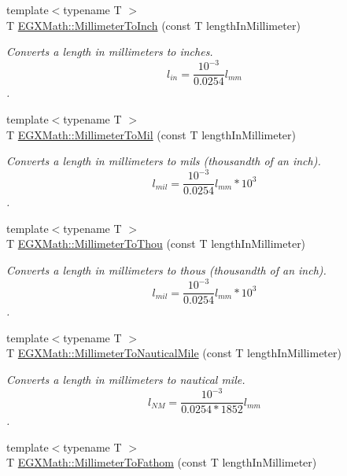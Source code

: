 \begin{DoxyCompactItemize}
{\footnotesize template$<$typename T $>$ }\\T \mbox{\hyperlink{group___e_g_x_math-_conversions-_length_conversions-_s_i-_millimeter-_imperial_gaaf0d8029c38ed975edf3805a0a3a53f7}{E\+G\+X\+Math\+::\+Millimeter\+To\+Inch}} (const T length\+In\+Millimeter)
\begin{DoxyCompactList}\small\item\em Converts a length in millimeters to inches. \[ l_{in}= \frac{10^{-3}}{0.0254} l_{mm} \]. \end{DoxyCompactList}\item 
{\footnotesize template$<$typename T $>$ }\\T \mbox{\hyperlink{group___e_g_x_math-_conversions-_length_conversions-_s_i-_millimeter-_imperial_gaf811317f4ce575df4ff0329491e92fac}{E\+G\+X\+Math\+::\+Millimeter\+To\+Mil}} (const T length\+In\+Millimeter)
\begin{DoxyCompactList}\small\item\em Converts a length in millimeters to mils (thousandth of an inch). \[ l_{mil}= \frac{10^{-3}}{0.0254} l_{mm} * 10^{3} \]. \end{DoxyCompactList}\item 
{\footnotesize template$<$typename T $>$ }\\T \mbox{\hyperlink{group___e_g_x_math-_conversions-_length_conversions-_s_i-_millimeter-_imperial_ga099bde3b0f85fbbfbe91f0162a392835}{E\+G\+X\+Math\+::\+Millimeter\+To\+Thou}} (const T length\+In\+Millimeter)
\begin{DoxyCompactList}\small\item\em Converts a length in millimeters to thous (thousandth of an inch). \[ l_{mil}= \frac{10^{-3}}{0.0254} l_{mm} * 10^{3} \]. \end{DoxyCompactList}\item 
{\footnotesize template$<$typename T $>$ }\\T \mbox{\hyperlink{group___e_g_x_math-_conversions-_length_conversions-_s_i-_millimeter-_nautical_ga05ed5fb1300287763d8927ee90315808}{E\+G\+X\+Math\+::\+Millimeter\+To\+Nautical\+Mile}} (const T length\+In\+Millimeter)
\begin{DoxyCompactList}\small\item\em Converts a length in millimeters to nautical mile. \[ l_{NM}= \frac{10^{-3}}{0.0254 * 1852} l_{mm} \]. \end{DoxyCompactList}\item 
{\footnotesize template$<$typename T $>$ }\\T \mbox{\hyperlink{group___e_g_x_math-_conversions-_length_conversions-_s_i-_millimeter-_nautical_ga1dce4ee3123e0132aae95bc9f7d0ac31}{E\+G\+X\+Math\+::\+Millimeter\+To\+Fathom}} (const T length\+In\+Millimeter)

\end{DoxyCompactItemize}
